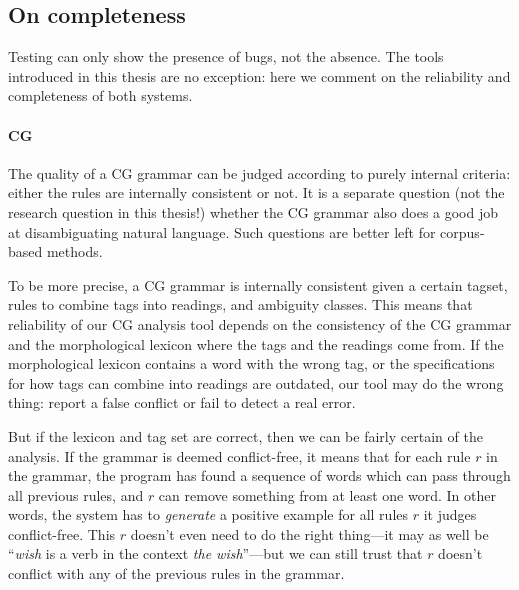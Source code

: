 \subsection{On completeness}

Testing can only show the presence of bugs, not the absence. The tools
introduced in this thesis are no exception: here we comment on the
reliability and completeness of both systems.


\paragraph{CG}

The quality of a CG grammar can be judged according to purely internal
criteria: either the rules are internally consistent or not. It is a
separate question (not the research question in this thesis!) whether
the CG grammar also does a good job at disambiguating natural
language. Such questions are better left for corpus-based methods.

To be more precise, a CG grammar is internally consistent given a
certain tagset, rules to combine tags into readings, and ambiguity
classes. %
This means that reliability of our CG analysis tool depends on the
consistency of the CG grammar and the morphological lexicon where the
tags and the readings come from. If the morphological
lexicon contains a word with the wrong tag, or the specifications for
how tags can combine into readings are outdated, our tool may do the
wrong thing: report a false conflict or fail to detect a real error.

But if the lexicon and tag set are correct, then we can be fairly
certain of the analysis. If the grammar is deemed conflict-free, it
means that for each rule $r$ in the grammar, the program has found a
sequence of words which can pass through all previous rules, and $r$
can remove something from at least one word. In other words, the
system has to \emph{generate} a positive example for all rules $r$ it
judges conflict-free. %
This $r$ doesn't even need to do the right thing---it may as well be
``\emph{wish} is a verb in the context \emph{the wish}''---but we can
still trust that $r$ doesn't conflict with any of the previous rules
in the grammar.



